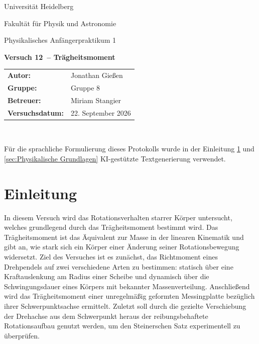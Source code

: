 \documentclass[12pt,a4paper,titlepage]{scrartcl}
\numberwithin{equation}{section}
\numberwithin{table}{section}
\numberwithin{figure}{section}
\newcommand{\versuch}{Versuch 12}
\newcommand{\titel}{Trägheitsmoment}
\newcommand{\praktikum}{Physikalisches Anfängerpraktikum 1}
\newcommand{\autor}{Jonathan Gießen}
\newcommand{\gruppe}{Gruppe 8}
\newcommand{\datum}{22. September 2026}
\newcommand{\betreuer}{Miriam Stangier}
\begin{document}
\pagestyle{scrheadings}

\begin{titlepage}



    \centering
    \vspace*{4cm}
    {\large Universität Heidelberg\par}
    {\small Fakultät für Physik und Astronomie\par}
    {\Large \praktikum\par}
    \vspace{0.8cm}
    {\LARGE \bfseries \versuch\ -- \titel\par}
    \vspace{1.5cm}

    \begin{tabular}{ll}
        \textbf{Autor:} & \autor\\
        \textbf{Gruppe:} & \gruppe\\
        \textbf{Betreuer:} & \betreuer\\
        \textbf{Versuchsdatum:} & \datum\\
    \end{tabular}

    \vfill
    \hrulefill\
\end{titlepage}

\tableofcontents

\bigskip
\begin{tcolorbox}[colback=gray!5,colframe=gray!60,boxrule=0.8pt,arc=0.01mm,title=KI-Hinweis]
    Für die sprachliche Formulierung dieses Protokolls wurde in der Einleitung \ref{sec:Einleitung} und \ref{sec:Physikalische Grundlagen} KI-gestützte Textgenerierung verwendet. 
\end{tcolorbox}

\clearpage


\section{Einleitung}\label{sec:Einleitung}
In diesem Versuch wird das Rotationsverhalten starrer Körper untersucht, welches grundlegend durch das Trägheitsmoment bestimmt wird. Das Trägheitsmoment ist das Äquivalent zur Masse in der linearen Kinematik und gibt an, wie stark sich ein Körper einer Änderung seiner Rotationsbewegung widersetzt. Ziel des Versuches ist es zunächst, das Richtmoment eines Drehpendels auf zwei verschiedene Arten zu bestimmen: statisch über eine Kraftauslenkung am Radius einer Scheibe und dynamisch über die Schwingungsdauer eines Körpers mit bekannter Massenverteilung. Anschließend wird das Trägheitsmoment einer unregelmäßig geformten Messingplatte bezüglich ihrer Schwerpunktsachse ermittelt. Zuletzt soll durch die gezielte Verschiebung der Drehachse aus dem Schwerpunkt heraus der reibungsbehaftete Rotationsaufbau genutzt werden, um den Steinerschen Satz experimentell zu überprüfen. 
\end{document}
